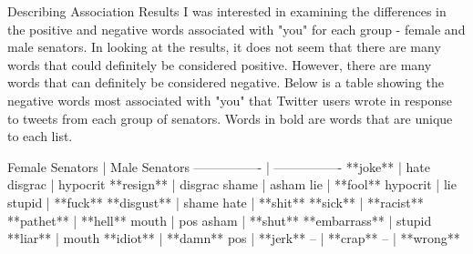 Describing Association Results
I was interested in examining the differences in the positive and negative words associated with "you" for each group - female and male senators. In looking at the results, it does not seem that there are many words that could definitely be considered positive. However, there are many words that can definitely be considered negative. Below is a table showing the negative words most associated with "you" that Twitter users wrote in response to tweets from each group of senators. Words in bold are words that are unique to each list. 

Female Senators  |  Male Senators  
---------------- | ---------------- 
**joke** 		     |  hate		   
disgrac 	  |  hypocrit	 
**resign**  	  |  disgrac   
shame		     |  asham		 
lie		      |  **fool**	     
hypocrit    |  lie 		   
stupid	    |  **fuck**		   
**disgust**	    |  shame		 
hate		     |  **shit**		   
**sick**		     |  **racist**		 
**pathet**		  |  **hell**		   
mouth		    |  pos		   
asham		     |  **shut**		   
**embarrass**	   |  stupid		 
**liar**		    |  mouth		 
**idiot**		     |  **damn**		   
pos		       |  **jerk**		   
--                |  **crap**		   
--                |  **wrong**		 

